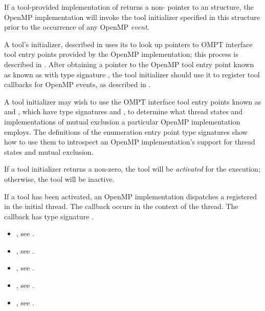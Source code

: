 If a tool-provided implementation of  returns a
non- pointer to an  structure,
the OpenMP implementation will invoke the tool initializer specified
in this structure prior to the occurrence of any OpenMP \emph{event}. 

A tool's initializer, described in 
uses its \callbackarg{}  to look up pointers
to OMPT interface tool entry points provided by the OpenMP
implementation; this process is described in .
After obtaining a pointer to the OpenMP tool entry point known as
known as  with type signature
, the tool initializer should use it to
register tool callbacks for OpenMP events, as described in
.

A tool initializer may wish to use the OMPT interface tool
entry points known as  and
, which have type signatures
 and
, to determine what thread
states and implementations of mutual exclusion a particular OpenMP
implementation employs. The definitions of the enumeration entry point
type signatures show how to use them to introspect an OpenMP
implementation's support for thread states and mutual exclusion.

If a tool initializer returns a non-zero, the tool will be
\emph{activated} for the execution; otherwise, the tool will be
inactive.

If a tool has been activated, an OpenMP implementation dispatches
a registered  in the initial
thread. The callback occurs in the context of the thread.  The
callback has type signature .

\crossreferences
\begin{itemize}
\item {}, see .
\item {}, see .
\item {}, see .
\item {}, see .
\item {}, see
  .
\end{itemize}


